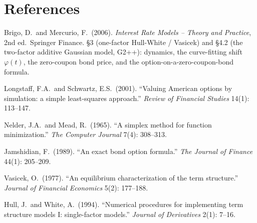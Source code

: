 \documentclass[11pt,a4paper]{article}
\theoremstyle{definition}
\begin{document}
\section*{References}

\begin{enumerate}[label={[\arabic*]}]
  \item\label{brigo_mercurio} Brigo, D.\ and Mercurio, F.\ (2006).
        \textit{Interest Rate Models -- Theory and Practice}, 2nd ed.\
        Springer Finance. \S3 (one-factor Hull-White / Vasicek) and \S4.2
        (the two-factor additive Gaussian model, G2++): dynamics, the
        curve-fitting shift $\varphi(t)$, the zero-coupon bond price, and
        the option-on-a-zero-coupon-bond formula.
  \item\label{longstaff_schwartz} Longstaff, F.A.\ and Schwartz, E.S.\ (2001).
        ``Valuing American options by simulation: a simple least-squares
        approach.'' \textit{Review of Financial Studies} 14(1): 113--147.
  \item\label{nelder_mead} Nelder, J.A.\ and Mead, R.\ (1965).
        ``A simplex method for function minimization.''
        \textit{The Computer Journal} 7(4): 308--313.
  \item\label{jamshidian1989} Jamshidian, F.\ (1989).
        ``An exact bond option formula.''
        \textit{The Journal of Finance} 44(1): 205--209.
  \item\label{vasicek1977} Vasicek, O.\ (1977).
        ``An equilibrium characterization of the term structure.''
        \textit{Journal of Financial Economics} 5(2): 177--188.
  \item\label{hull_white1994} Hull, J.\ and White, A.\ (1994).
        ``Numerical procedures for implementing term structure models I:
        single-factor models.'' \textit{Journal of Derivatives} 2(1): 7--16.
\end{enumerate}
\end{document}
